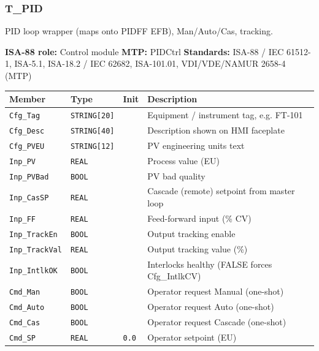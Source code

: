 \subsubsection*{T\_PID}
\label{app:pclib:tpid}
PID loop wrapper (maps onto PIDFF EFB), Man/\allowbreak{}Auto/\allowbreak{}Cas, tracking.

{\small\textbf{ISA-88 role:} Control module \quad \textbf{MTP:} PIDCtrl \quad \textbf{Standards:} ISA-88 /\allowbreak{} IEC 61512-1, ISA-5.1, ISA-18.2 /\allowbreak{} IEC 62682, ISA-101.01, VDI/\allowbreak{}VDE/\allowbreak{}NAMUR 2658-4 (MTP)}
{\footnotesize
\begin{longtable}{@{}>{\raggedright\arraybackslash}p{3.4cm}>{\raggedright\arraybackslash}p{3.3cm}>{\raggedright\arraybackslash}p{1.3cm}>{\raggedright\arraybackslash}p{6.4cm}@{}}
\toprule
\rowcolor{tblhead}\textbf{Member} & \textbf{Type} & \textbf{Init} & \textbf{Description} \\
\midrule
\endhead
\texttt{Cfg\_Tag} & \texttt{STRING[20]} &  & Equipment /\allowbreak{} instrument tag, e.g. FT-101 \\
\texttt{Cfg\_Desc} & \texttt{STRING[40]} &  & Description shown on HMI faceplate \\
\texttt{Cfg\_PVEU} & \texttt{STRING[12]} &  & PV engineering units text \\
\texttt{Inp\_PV} & \texttt{REAL} &  & Process value (EU) \\
\texttt{Inp\_PVBad} & \texttt{BOOL} &  & PV bad quality \\
\texttt{Inp\_CasSP} & \texttt{REAL} &  & Cascade (remote) setpoint from master loop \\
\texttt{Inp\_FF} & \texttt{REAL} &  & Feed-forward input (\% CV) \\
\texttt{Inp\_TrackEn} & \texttt{BOOL} &  & Output tracking enable \\
\texttt{Inp\_TrackVal} & \texttt{REAL} &  & Output tracking value (\%) \\
\texttt{Inp\_IntlkOK} & \texttt{BOOL} &  & Interlocks healthy (FALSE forces Cfg\_IntlkCV) \\
\texttt{Cmd\_Man} & \texttt{BOOL} &  & Operator request Manual (one-shot) \\
\texttt{Cmd\_Auto} & \texttt{BOOL} &  & Operator request Auto (one-shot) \\
\texttt{Cmd\_Cas} & \texttt{BOOL} &  & Operator request Cascade (one-shot) \\
\texttt{Cmd\_SP} & \texttt{REAL} & \texttt{0.0} & Operator setpoint (EU) \\

\end{longtable}}
